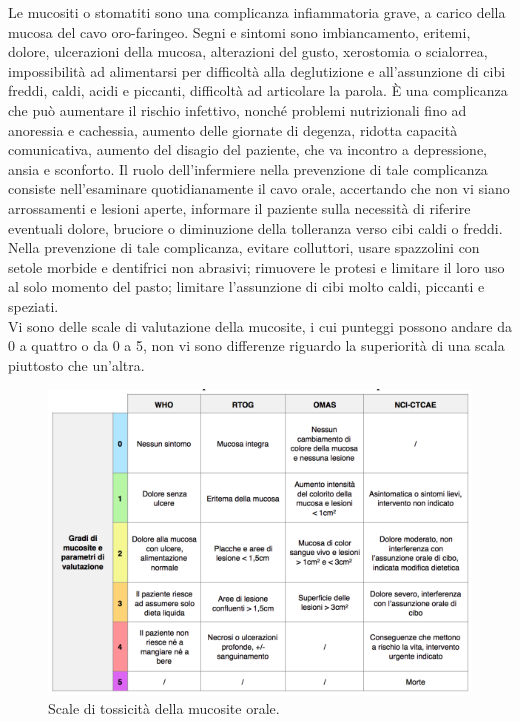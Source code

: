 Le mucositi o stomatiti sono una complicanza infiammatoria grave, a carico della mucosa del cavo oro-faringeo. 
Segni e sintomi sono imbiancamento, eritemi, dolore, ulcerazioni della mucosa, alterazioni del gusto, xerostomia o 
scialorrea, impossibilità ad alimentarsi per difficoltà alla deglutizione e all’assunzione di cibi freddi, caldi, 
acidi e piccanti, difficoltà ad articolare la parola. È una complicanza che può aumentare il rischio infettivo, 
nonché problemi nutrizionali fino ad anoressia e cachessia, aumento delle giornate di degenza, ridotta capacità 
comunicativa, aumento del disagio del paziente, che va incontro a depressione, ansia e sconforto\cite{mucositi}. 
Il ruolo dell’infermiere nella prevenzione di tale complicanza consiste nell’esaminare quotidianamente il cavo orale, 
accertando che non vi siano arrossamenti e lesioni aperte, informare il paziente sulla necessità di riferire 
eventuali dolore, bruciore o diminuzione della tolleranza verso cibi caldi o freddi. Nella prevenzione di tale 
complicanza, evitare colluttori, usare spazzolini con setole morbide e dentifrici non abrasivi; rimuovere le 
protesi e limitare il loro uso al solo momento del pasto; limitare l'assunzione di cibi molto caldi, 
piccanti e speziati\cite{mucositi}.\\ 
Vi sono delle scale di valutazione della mucosite, i cui punteggi possono andare da 0 a quattro o 
da 0 a 5, non vi sono differenze riguardo la superiorità di una scala piuttosto che un’altra\cite{SCALEmucositi}.\\

\begin{figure}[H]
    \begin{center}
    \includegraphics[width=0.8\columnwidth]{img/SCALEMUCOSITI.png}
    \end{center}
    \caption[Scale di tossicità della mucosite orale.]{Scale di tossicità della mucosite orale.
    \cite{img39BIS}}

\end{figure}


